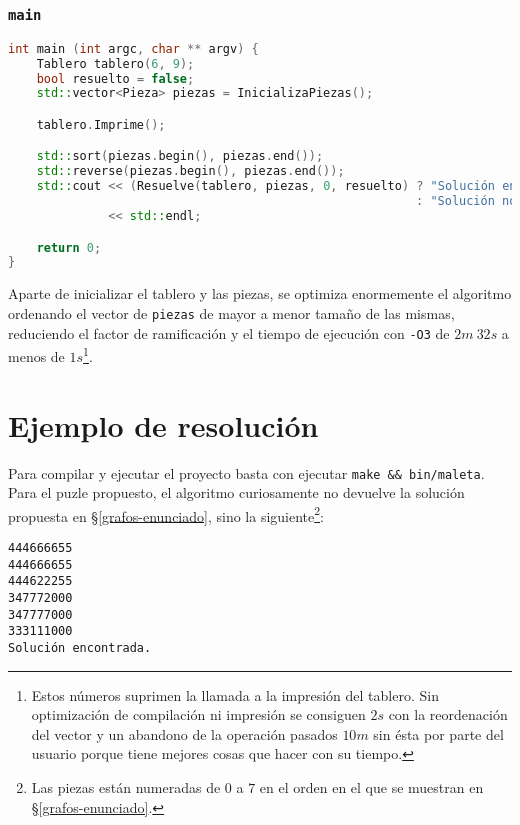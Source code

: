 \pagebreak

\subsubsection{\texttt{main}}\label{grafos-implementacion-algoritmo-main}

\begin{lstlisting}[language=C++]
int main (int argc, char ** argv) {
	Tablero tablero(6, 9);
	bool resuelto = false;
	std::vector<Pieza> piezas = InicializaPiezas();

	tablero.Imprime();

	std::sort(piezas.begin(), piezas.end());
	std::reverse(piezas.begin(), piezas.end());
	std::cout << (Resuelve(tablero, piezas, 0, resuelto) ? "Solución encontrada."
	                                                     : "Solución no encontrada")
	          << std::endl;

	return 0;
}
\end{lstlisting}

Aparte de inicializar el tablero y las piezas, se optimiza enormemente el algoritmo ordenando el vector de \texttt{piezas} de mayor a menor tamaño de las mismas, reduciendo el factor de ramificación y el tiempo de ejecución con \texttt{-O3} de $2m\ 32s$ a menos de $1s$\footnote{%
	Estos números suprimen la llamada a la impresión del tablero.
	Sin optimización de compilación ni impresión se consiguen $2s$ con la reordenación del vector y un abandono de la operación pasados $10m$ sin ésta por parte del usuario porque tiene mejores cosas que hacer con su tiempo.
}.

\section{Ejemplo de resolución}\label{grafos-resolucion}

Para compilar y ejecutar el proyecto basta con ejecutar \texttt{make \&\& bin/maleta}.
Para el puzle propuesto, el algoritmo curiosamente no devuelve la solución propuesta en \S\ref{grafos-enunciado}, sino la siguiente\footnote{%
	Las piezas están numeradas de $0$ a $7$ en el orden en el que se muestran en \S\ref{grafos-enunciado}.
}:

\begin{lstlisting}
444666655
444666655
444622255
347772000
347777000
333111000
Solución encontrada.
\end{lstlisting}
